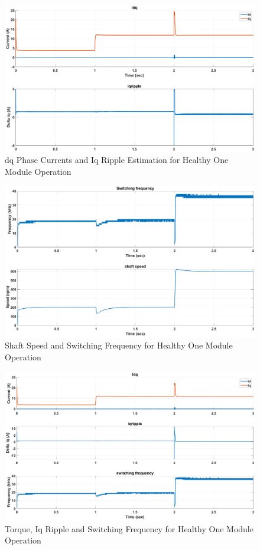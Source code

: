 \documentclass{article}
\begin{document}
\begin{figure}[H]
\centering
\includegraphics[scale=0.35]{SimulationResults/one_module/Idq_iqripple.eps}
\caption{dq Phase Currents and Iq Ripple Estimation for Healthy One Module Operation}
\label{fig:PhaseCurrentsDqOneModuleHealthy}
\end{figure}

\begin{figure}[H]
\centering
\includegraphics[scale=0.35]{SimulationResults/one_module/speed_fsw.eps}
\caption{Shaft Speed and Switching Frequency for Healthy One Module Operation}
\label{fig:ShaftSpeedFswOneModuleHealthy}
\end{figure}

\begin{figure}[H]
\centering
\includegraphics[scale=0.35]{SimulationResults/one_module/te_iqripple_fsw.eps}
\caption{Torque, Iq Ripple and Switching Frequency for Healthy One Module Operation}
\label{fig:TorqueIqrippleFswOneModuleHealthy}
\end{figure}
\end{document}
